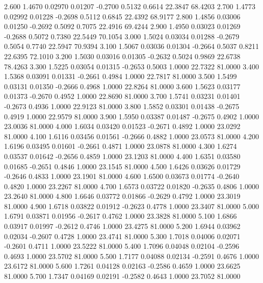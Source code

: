    2.600   1.4670   0.02970   0.01207  -0.2700   0.5132   0.6614  22.3847  68.4203
   2.700   1.4773   0.02992   0.01228  -0.2698   0.5112   0.6845  22.4392  68.9177
   2.800   1.4856   0.03006   0.01250  -0.2692   0.5092   0.7075  22.4916  69.4244
   2.900   1.4950   0.03023   0.01269  -0.2688   0.5072   0.7380  22.5449  70.1054
   3.000   1.5024   0.03034   0.01288  -0.2679   0.5054   0.7740  22.5947  70.9394
   3.100   1.5067   0.03036   0.01304  -0.2664   0.5037   0.8211  22.6395  72.1010
   3.200   1.5030   0.03016   0.01305  -0.2632   0.5024   0.9869  22.6738  78.4263
   3.300   1.5225   0.03054   0.01315  -0.2653   0.5003   1.0000  22.7322  81.0000
   3.400   1.5368   0.03091   0.01331  -0.2661   0.4984   1.0000  22.7817  81.0000
   3.500   1.5499   0.03131   0.01350  -0.2666   0.4968   1.0000  22.8264  81.0000
   3.600   1.5623   0.03177   0.01373  -0.2670   0.4952   1.0000  22.8690  81.0000
   3.700   1.5741   0.03231   0.01401  -0.2673   0.4936   1.0000  22.9123  81.0000
   3.800   1.5852   0.03301   0.01438  -0.2675   0.4919   1.0000  22.9579  81.0000
   3.900   1.5950   0.03387   0.01487  -0.2675   0.4902   1.0000  23.0036  81.0000
   4.000   1.6034   0.03420   0.01523  -0.2671   0.4892   1.0000  23.0292  81.0000
   4.100   1.6116   0.03456   0.01561  -0.2666   0.4882   1.0000  23.0573  81.0000
   4.200   1.6196   0.03495   0.01601  -0.2661   0.4871   1.0000  23.0878  81.0000
   4.300   1.6274   0.03537   0.01642  -0.2656   0.4859   1.0000  23.1203  81.0000
   4.400   1.6351   0.03580   0.01685  -0.2651   0.4846   1.0000  23.1545  81.0000
   4.500   1.6426   0.03626   0.01729  -0.2646   0.4833   1.0000  23.1901  81.0000
   4.600   1.6500   0.03673   0.01774  -0.2640   0.4820   1.0000  23.2267  81.0000
   4.700   1.6573   0.03722   0.01820  -0.2635   0.4806   1.0000  23.2640  81.0000
   4.800   1.6646   0.03772   0.01866  -0.2629   0.4792   1.0000  23.3019  81.0000
   4.900   1.6718   0.03822   0.01912  -0.2623   0.4778   1.0000  23.3407  81.0000
   5.000   1.6791   0.03871   0.01956  -0.2617   0.4762   1.0000  23.3828  81.0000
   5.100   1.6866   0.03917   0.01997  -0.2612   0.4746   1.0000  23.4275  81.0000
   5.200   1.6944   0.03962   0.02034  -0.2607   0.4728   1.0000  23.4741  81.0000
   5.300   1.7018   0.04006   0.02071  -0.2601   0.4711   1.0000  23.5222  81.0000
   5.400   1.7096   0.04048   0.02104  -0.2596   0.4693   1.0000  23.5702  81.0000
   5.500   1.7177   0.04088   0.02134  -0.2591   0.4676   1.0000  23.6172  81.0000
   5.600   1.7261   0.04128   0.02163  -0.2586   0.4659   1.0000  23.6625  81.0000
   5.700   1.7347   0.04169   0.02191  -0.2582   0.4643   1.0000  23.7052  81.0000
